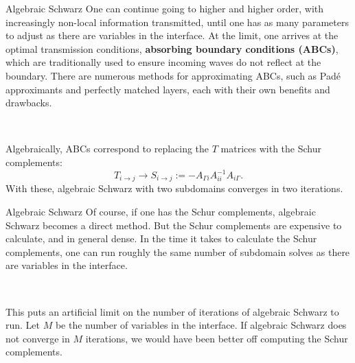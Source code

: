\documentclass{beamer}
\begin{document}
\begin{frame}{Algebraic Schwarz}
One can continue going to higher and higher order, with increasingly non-local information transmitted, until one has as many parameters to adjust as there are variables in the interface.
At the limit, one arrives at the optimal transmission conditions, \textbf{absorbing boundary conditions (ABCs)}, which are traditionally used to ensure incoming waves do not reflect at the boundary.
There are numerous methods for approximating ABCs, such as Pad\'e approximants and perfectly matched layers, each with their own benefits and drawbacks.

~

Algebraically, ABCs correspond to replacing the $T$ matrices with the Schur complements:
\begin{equation*}
	T_{i \to j} \to S_{i \to j} := -A_{\Gamma i} A_{ii}^{-1} A_{i \Gamma}.
\end{equation*}
With these, algebraic Schwarz with two subdomains converges in two iterations.
\end{frame}

\begin{frame}{Algebraic Schwarz}
Of course, if one has the Schur complements, algebraic Schwarz becomes a direct method.
But the Schur complements are expensive to calculate, and in general dense.
In the time it takes to calculate the Schur complements, one can run roughly the same number of subdomain solves as there are variables in the interface.

~

This puts an artificial limit on the number of iterations of algebraic Schwarz to run.
Let $M$ be the number of variables in the interface.
If algebraic Schwarz does not converge in $M$ iterations, we would have been better off computing the Schur complements.
\end{frame}
\end{document}
